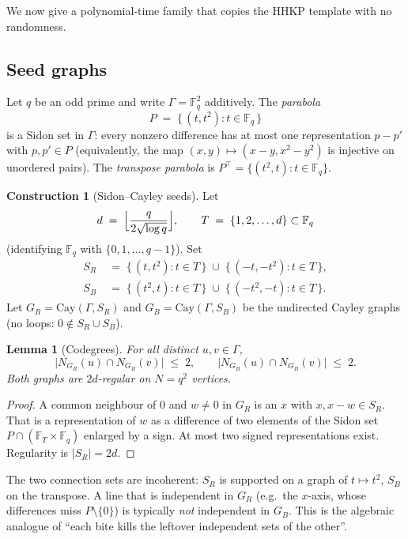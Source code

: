 \documentclass[11pt]{article}
\newtheorem{lemma}[theorem]{Lemma}
\theoremstyle{definition}
\newtheorem{construction}[theorem]{Construction}
\newcommand{\F}{\mathbb{F}}
\begin{document}
We now give a polynomial-time family that copies the HHKP template with no randomness.

\subsection{Seed graphs}

Let $q$ be an odd prime and write $\Gamma=\F_{q}^{2}$ additively.
The \emph{parabola}
\[
  P \;=\; \bigl\{\,(t,t^{2}):t\in\F_{q}\,\bigr\}
\]
is a Sidon set in $\Gamma$: every nonzero difference has at most one representation $p-p'$ with $p,p'\in P$ (equivalently, the map $(x,y)\mapsto(x-y,x^{2}-y^{2})$ is injective on unordered pairs).
The \emph{transpose parabola} is $P^{\top}=\{(t^{2},t):t\in\F_{q}\}$.

\begin{construction}[Sidon--Cayley seeds]\label{con:seeds}
Let
\[
  d \;=\; \Bigl\lfloor \frac{q}{2\sqrt{\log q}}\Bigr\rfloor,
  \qquad
  T \;=\; \{1,2,\dots,d\}\subset\F_{q}
\]
(identifying $\F_{q}$ with $\{0,1,\dots,q-1\}$).
Set
\begin{align*}
  S_{R} &\;=\; \bigl\{\,(t,t^{2}):t\in T\,\bigr\}\;\cup\;\bigl\{\,(-t,-t^{2}):t\in T\,\bigr\},\\
  S_{B} &\;=\; \bigl\{\,(t^{2},t):t\in T\,\bigr\}\;\cup\;\bigl\{\,(-t^{2},-t):t\in T\,\bigr\}.
\end{align*}
Let $G_{R}=\mathrm{Cay}(\Gamma,S_{R})$ and $G_{B}=\mathrm{Cay}(\Gamma,S_{B})$ be the undirected Cayley graphs
(no loops: $0\notin S_{R}\cup S_{B}$).
\end{construction}

\begin{lemma}[Codegrees]\label{lem:sidon}
For all distinct $u,v\in\Gamma$,
\[
  \bigl|N_{G_{R}}(u)\cap N_{G_{R}}(v)\bigr|\;\le\;2,
  \qquad
  \bigl|N_{G_{B}}(u)\cap N_{G_{B}}(v)\bigr|\;\le\;2.
\]
Both graphs are $2d$-regular on $N=q^{2}$ vertices.
\end{lemma}

\begin{proof}
A common neighbour of $0$ and $w\neq 0$ in $G_{R}$ is an $x$ with $x,x-w\in S_{R}$.
That is a representation of $w$ as a difference of two elements of the Sidon set $P\cap(\F_{T}\times\F_{q})$ enlarged by a sign.
At most two signed representations exist.
Regularity is $|S_{R}|=2d$.
\end{proof}

The two connection sets are incoherent: $S_{R}$ is supported on a graph of $t\mapsto t^{2}$, $S_{B}$ on the transpose.
A line that is independent in $G_{R}$ (e.g.\ the $x$-axis, whose differences miss $P\setminus\{0\}$) is typically \emph{not} independent in $G_{B}$.
This is the algebraic analogue of ``each bite kills the leftover independent sets of the other''.
\end{document}
